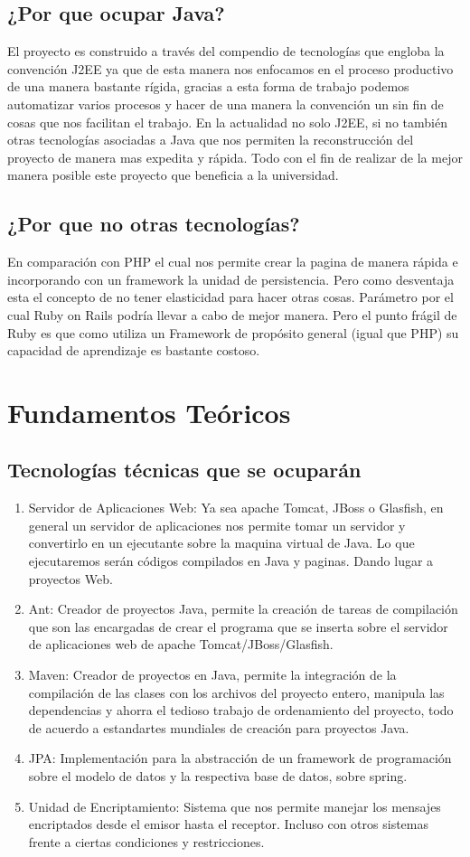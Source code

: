 \documentclass[a4paper,12pt,openany,oneside]{book}
\begin{document}
\subsection{¿Por que ocupar Java?}
El proyecto es construido a través del compendio de tecnologías que engloba la convención J2EE ya que de esta manera nos enfocamos en el proceso productivo de una manera bastante rígida, gracias a esta forma de trabajo podemos automatizar varios procesos y hacer de una manera la convención un sin fin de cosas que nos facilitan el trabajo. En la actualidad no solo J2EE, si no también otras tecnologías asociadas a Java que nos permiten la reconstrucción del proyecto de manera mas expedita y rápida. Todo con el fin de realizar de la mejor manera posible este proyecto que beneficia a la universidad.
\subsection{¿Por que no otras tecnologías?}
En comparación con PHP el cual nos permite crear la pagina de manera rápida e incorporando con un framework la unidad de persistencia. Pero como desventaja esta el concepto de no tener elasticidad para hacer otras cosas. Parámetro por el cual Ruby on Rails podría llevar a cabo de mejor manera. Pero el punto frágil de Ruby es que como utiliza un Framework de propósito general (igual que PHP) su capacidad de aprendizaje es bastante costoso. 
\section{Fundamentos Teóricos}
\subsection{Tecnologías técnicas que se ocuparán}
\begin{enumerate}
\item Servidor de Aplicaciones Web: Ya sea apache Tomcat, JBoss o Glasfish, en general un servidor de aplicaciones nos permite tomar un servidor y convertirlo en un ejecutante sobre la maquina virtual de Java. Lo que ejecutaremos serán códigos compilados en Java y paginas. Dando lugar a proyectos Web.
\item Ant: Creador de proyectos Java, permite la creación de tareas de compilación que son las encargadas de crear el programa que se inserta sobre el servidor de aplicaciones web de apache Tomcat/JBoss/Glasfish.
\item Maven: Creador de proyectos en Java, permite la integración de la compilación de las clases con los archivos del proyecto entero, manipula las dependencias y ahorra el tedioso trabajo de ordenamiento del proyecto, todo de acuerdo a estandartes mundiales de creación para proyectos Java.
\item JPA: Implementación para la abstracción de un framework de programación sobre el modelo de datos y la respectiva base de datos, sobre spring.
\item Unidad de Encriptamiento: Sistema que nos permite manejar los mensajes encriptados desde el emisor hasta el receptor. Incluso con otros sistemas frente a ciertas condiciones y restricciones.
\end{enumerate}
\end{document}

